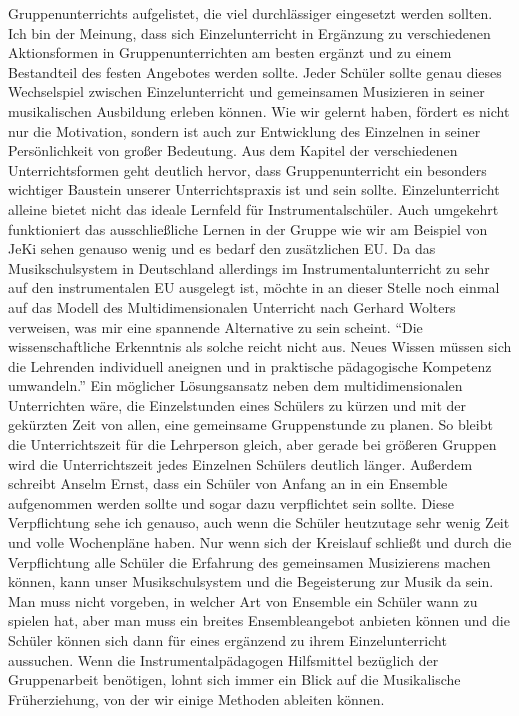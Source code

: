 Gruppenunterrichts aufgelistet, die viel durchlässiger eingesetzt werden
sollten. Ich bin der Meinung, dass sich Einzelunterricht in Ergänzung zu
verschiedenen Aktionsformen in Gruppenunterrichten am besten ergänzt und zu einem
Bestandteil des festen Angebotes werden sollte. 
Jeder Schüler sollte genau dieses Wechselspiel zwischen
Einzelunterricht und gemeinsamen Musizieren in seiner musikalischen Ausbildung
erleben können. Wie wir gelernt haben, fördert es nicht nur die Motivation,
sondern ist auch zur Entwicklung des Einzelnen in seiner Persönlichkeit von
großer Bedeutung. 
Aus dem Kapitel der verschiedenen Unterrichtsformen geht deutlich hervor, dass
Gruppenunterricht ein besonders wichtiger Baustein unserer Unterrichtspraxis
ist und sein sollte. Einzelunterricht alleine bietet nicht das ideale Lernfeld
für Instrumentalschüler. Auch umgekehrt funktioniert das ausschließliche Lernen
in der Gruppe wie wir am Beispiel von JeKi sehen genauso wenig und es bedarf den
zusätzlichen EU. Da das Musikschulsystem in Deutschland allerdings im
Instrumentalunterricht zu sehr auf den instrumentalen EU ausgelegt ist, möchte
in an dieser Stelle noch einmal auf das Modell des Multidimensionalen Unterricht
nach Gerhard Wolters verweisen, was mir eine spannende Alternative zu sein
scheint. %
\enquote{Die wissenschaftliche Erkenntnis als solche reicht nicht aus. Neues Wissen
müssen sich die Lehrenden individuell aneignen und in praktische pädagogische
Kompetenz umwandeln.} \autocite[10]{losert:die_kunst_zu_unterrichten} Ein
möglicher Lösungsansatz neben dem multidimensionalen Unterrichten wäre, die
Einzelstunden eines Schülers zu kürzen und mit der gekürzten Zeit von allen, eine
gemeinsame Gruppenstunde zu planen. So bleibt die Unterrichtszeit für die
Lehrperson gleich, aber gerade bei größeren Gruppen wird die Unterrichtszeit
jedes Einzelnen Schülers deutlich länger.\autocite[33]{losert:die_kunst_zu_unterrichten}
Außerdem schreibt Anselm Ernst, dass ein Schüler von Anfang an in ein Ensemble
aufgenommen werden sollte und sogar dazu verpflichtet sein sollte. \autocite[61]{ernst:die_zukunftsfaehige_musikschule}
Diese Verpflichtung sehe ich genauso, auch wenn die Schüler heutzutage sehr
wenig Zeit und volle Wochenpläne haben. Nur wenn sich der Kreislauf schließt und
durch die Verpflichtung alle Schüler die Erfahrung des gemeinsamen
Musizierens machen können, kann unser Musikschulsystem und die Begeisterung zur
Musik da sein. Man muss nicht vorgeben, in welcher Art von Ensemble ein Schüler
wann zu spielen hat, aber man muss ein breites Ensembleangebot anbieten können
und die Schüler können sich dann für eines ergänzend zu ihrem Einzelunterricht
aussuchen. Wenn die Instrumentalpädagogen Hilfsmittel bezüglich der
Gruppenarbeit benötigen, lohnt sich immer ein Blick auf die Musikalische
Früherziehung, von der wir einige Methoden ableiten können. 

